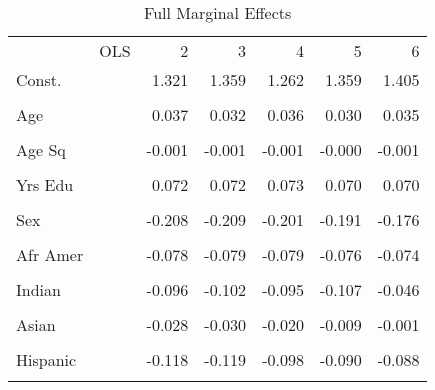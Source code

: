 \documentclass[12pt]{article}
\begin{document}
\begin{table} \centering
  \caption{Full Marginal Effects}
  \begin{threeparttable}
    \begin{tabular}[l]{l l r r r r r}
      \cmidrule{1-7}

                  & OLS      & 2     & 3     & 4    &  5    &  6    \\
      \cmidrule{1-7}

      Const.      &   & 1.321  & 1.359  & 1.262  & 1.359  & 1.405       \\
                  &   &   &   &   &   &        \\[0.3cm]
       
      Age         &   & 0.037  & 0.032  & 0.036  & 0.030  & 0.035       \\
                  &   &   &   &   &   &        \\[0.3cm]
      
      Age Sq      &   & -0.001  & -0.001  & -0.001  & -0.000  & -0.001       \\
                  &   &   &   &   &   &        \\[0.3cm]
       
      Yrs Edu     &   & 0.072  & 0.072  & 0.073  & 0.070  & 0.070       \\
                  &   &   &   &   &   &        \\[0.3cm]
        
      Sex         &   & -0.208  & -0.209  & -0.201  & -0.191  & -0.176       \\
                  &   &   &   &   &   &        \\[0.3cm]
       
      Afr Amer    &   & -0.078  & -0.079  & -0.079  & -0.076  & -0.074       \\
                  &   &   &   &   &   &        \\[0.3cm]
       
      Indian      &   & -0.096  & -0.102  & -0.095  & -0.107  & -0.046       \\
                  &   &   &   &   &   &        \\[0.3cm]
       
      Asian       &   & -0.028  & -0.030  & -0.020  & -0.009  & -0.001      \\
                  &   &   &   &   &   &        \\[0.3cm]
       
      Hispanic    &   & -0.118  & -0.119  & -0.098  & -0.090  & -0.088       \\
                  &   &   &   &   &   &        \\[0.3cm]
        

\end{tabular}
\end{threeparttable}
\end{table}
\end{document}
